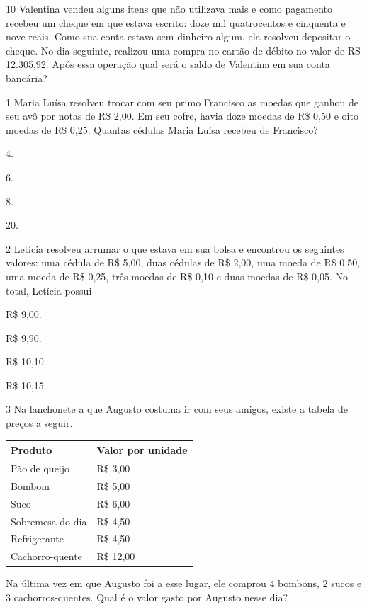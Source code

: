 \num{10} Valentina vendeu alguns itens que não utilizava mais e como pagamento
recebeu um cheque em que estava escrito: doze mil quatrocentos e
cinquenta e nove reais. Como sua conta estava sem dinheiro algum, ela
resolveu depositar o cheque. No dia seguinte, realizou uma compra no
cartão de débito no valor de RS 12.305,92. Após essa operação qual será o
saldo de Valentina em sua conta bancária?



\num{1} Maria Luísa resolveu trocar com seu primo Francisco as moedas que ganhou de seu avô por notas de
R\$ 2,00. Em seu cofre, havia doze moedas de R\$ 0,50
e oito moedas de R\$ 0,25. Quantas cédulas Maria Luísa recebeu de Francisco?

\begin{escolha}
\item
  4.
\item
  6.
\item
  8.
\item
  20.
\end{escolha}


\num{2} Letícia resolveu arrumar o que estava em sua bolsa e encontrou
os seguintes valores: uma cédula de R\$ 5,00, duas cédulas de R\$ 2,00, uma moeda de R\$ 0,50, uma moeda de R\$ 0,25, três moedas de R\$ 0,10 e duas moedas de R\$ 0,05. No total, Letícia possui

\begin{escolha}
\item
  R\$ 9,00.
\item
  R\$ 9,90.
\item
  R\$ 10,10.
\item
  R\$ 10,15.
\end{escolha}

\pagebreak

\num{3} Na lanchonete a que Augusto costuma ir com seus amigos, existe a tabela de preços a seguir.

\begin{longtable}[]{@{}ll@{}}
\toprule
Produto & Valor por unidade\tabularnewline
\midrule
\endhead
Pão de queijo & R\$ 3,00\tabularnewline
Bombom & R\$ 5,00\tabularnewline
Suco & R\$ 6,00\tabularnewline
Sobremesa do dia & R\$ 4,50\tabularnewline
Refrigerante & R\$ 4,50\tabularnewline
Cachorro-quente & R\$ 12,00\tabularnewline
\bottomrule
\end{longtable}

Na última vez em que Augusto foi a esse lugar, ele comprou 4 bombons, 2
sucos e 3 cachorros-quentes. Qual é o valor gasto por Augusto nesse dia?

